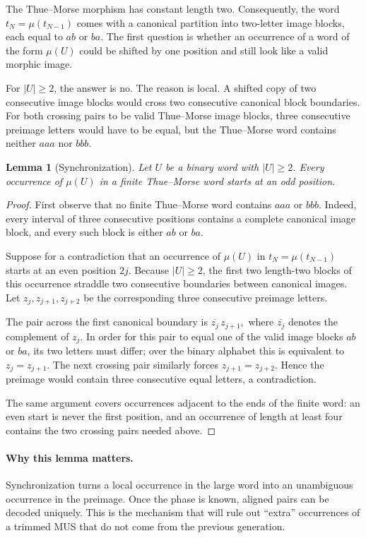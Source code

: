\documentclass[11pt,a4paper]{article}
\newtheorem{lemma}[theorem]{Lemma}
\theoremstyle{definition}\newtheorem{definition}[theorem]{Definition}
\theoremstyle{remark}\newtheorem{remark}[theorem]{Remark}
\begin{document}
The Thue--Morse morphism has constant length two. Consequently, the word $t_N=\mu(t_{N-1})$ comes with a canonical partition into two-letter image blocks, each equal to $ab$ or $ba$. The first question is whether an occurrence of a word of the form $\mu(U)$ could be shifted by one position and still look like a valid morphic image.

For $|U|\ge2$, the answer is no. The reason is local. A shifted copy of two consecutive image blocks would cross two consecutive canonical block boundaries. For both crossing pairs to be valid Thue--Morse image blocks, three consecutive preimage letters would have to be equal, but the Thue--Morse word contains neither $aaa$ nor $bbb$.

\begin{lemma}[Synchronization]
\label{lem:synchronization}
Let $U$ be a binary word with $|U|\ge2$. Every occurrence of $\mu(U)$ in a finite Thue--Morse word starts at an odd position.
\end{lemma}

\begin{proof}
First observe that no finite Thue--Morse word contains $aaa$ or $bbb$. Indeed, every interval of three consecutive positions contains a complete canonical image block, and every such block is either $ab$ or $ba$.

Suppose for a contradiction that an occurrence of $\mu(U)$ in $t_N=\mu(t_{N-1})$ starts at an even position $2j$. Because $|U|\ge2$, the first two length-two blocks of this occurrence straddle two consecutive boundaries between canonical images. Let $z_j,z_{j+1},z_{j+2}$ be the corresponding three consecutive preimage letters.

The pair across the first canonical boundary is
$
\overline{z_j}\,z_{j+1},
$
where $\overline{z_j}$ denotes the complement of $z_j$. In order for this pair to equal one of the valid image blocks $ab$ or $ba$, its two letters must differ; over the binary alphabet this is equivalent to $z_j=z_{j+1}$. The next crossing pair similarly forces $z_{j+1}=z_{j+2}$. Hence the preimage would contain three consecutive equal letters, a contradiction.

The same argument covers occurrences adjacent to the ends of the finite word: an even start is never the first position, and an occurrence of length at least four contains the two crossing pairs needed above.
\end{proof}

\paragraph{Why this lemma matters.}
Synchronization turns a local occurrence in the large word into an unambiguous occurrence in the preimage. Once the phase is known, aligned pairs can be decoded uniquely. This is the mechanism that will rule out ``extra'' occurrences of a trimmed MUS that do not come from the previous generation.
\end{document}
